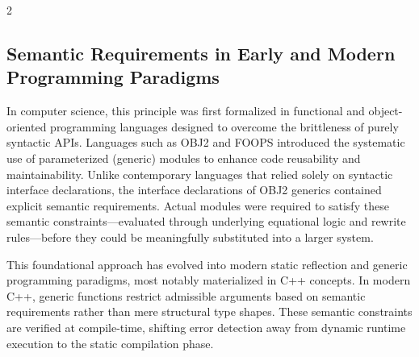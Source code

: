 \documentclass[11pt,letterpaper]{article}
\begin{document}
\begin{multicols*}{2}
\subsection{Semantic Requirements in Early and Modern Programming Paradigms}
In computer science, this principle was first formalized in functional and object-oriented programming languages designed to overcome the brittleness of purely syntactic APIs. Languages such as OBJ2 and FOOPS introduced the systematic use of parameterized (generic) modules to enhance code reusability and maintainability. Unlike contemporary languages that relied solely on syntactic interface declarations, the interface declarations of OBJ2 generics contained explicit semantic requirements. Actual modules were required to satisfy these semantic constraints—evaluated through underlying equational logic and rewrite rules—before they could be meaningfully substituted into a larger system.

This foundational approach has evolved into modern static reflection and generic programming paradigms, most notably materialized in C++ concepts. In modern C++, generic functions restrict admissible arguments based on semantic requirements rather than mere structural type shapes. These semantic constraints are verified at compile-time, shifting error detection away from dynamic runtime execution to the static compilation phase.


\end{multicols*}
\end{document}
